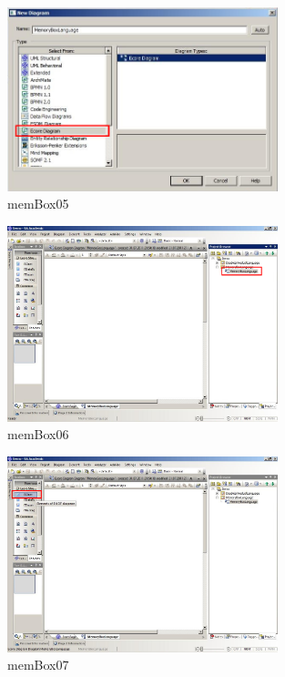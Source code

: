 \begin{figure}[!h]
	\centering
  \includegraphics[width=0.7\textwidth]{pics/memBox05.png}
	\caption{memBox05}
	\label{memBox05}
\end{figure}

\begin{figure}[!h]
	\centering
  \includegraphics[width=0.7\textwidth]{pics/memBox06.png}
	\caption{memBox06}
	\label{memBox06}
\end{figure}

\begin{figure}[!h]
	\centering
  \includegraphics[width=0.7\textwidth]{pics/memBox07.png}
	\caption{memBox07}
	\label{memBox07}
\end{figure}

